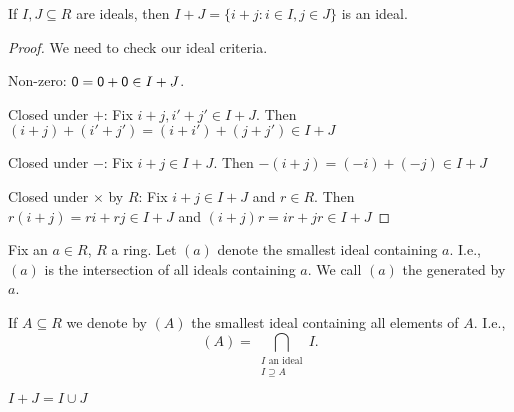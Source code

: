 \documentclass[notes.tex]{subfiles}
\begin{document}
\begin{proposition}
	If $I, J\subseteq R$ are ideals, then $I+J = \{i+j: i\in I, j\in J \}$ is an ideal.
\end{proposition}
\begin{proof}
	We need to check our ideal criteria.

	Non-zero: $\mathsf{0} = \mathsf{0} + \mathsf{0} \in I+J$.

	Closed under $+$: Fix $i+j, i'+j' \in I+J$. Then $(i+j) + (i'+j') = (i+i') + (j+j') \in I+J$

	Closed under $-$: Fix $i+j\in I+J$. Then $-(i+j) = (-i)+(-j) \in I+J$

	Closed under $\times$ by $R$:
	Fix $i+j\in I+J$ and $r\in R$.
	Then $r(i+j) = ri + rj \in I+J$ and $(i+j)r = ir + jr \in I+J$
\end{proof}

\begin{defn}
	Fix an $a\in R$, $R$ a ring. Let $(a)$ denote the smallest ideal containing $a$.
	I.e., $(a)$ is the intersection of all ideals containing $a$.
	We call $(a)$ the  generated by $a$.

  If $A\subseteq R$ we denote by $(A)$ the smallest ideal containing all elements of $A$. I.e., \[(A) = \bigcap_{\substack{I\text{ an ideal}\\I \supseteq A}}I.\]
\end{defn}
\begin{remark}
	$I+J = I\cup J$
\end{remark}
\end{document}

